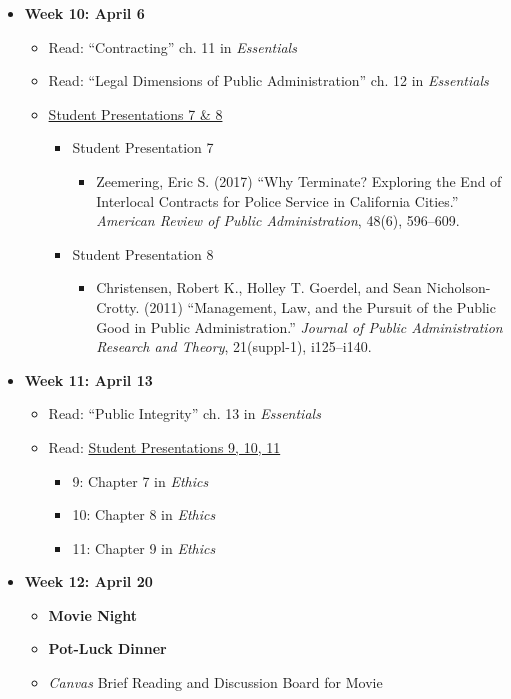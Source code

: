 \documentclass[11pt]{article}
\begin{document}
\begin{itemize}
	\item[] \textbf{Week 10: April 6} 
	\begin{itemize}
		\item Read: ``Contracting'' ch. 11 in \emph{Essentials}
		\item Read: ``Legal Dimensions of Public Administration'' ch. 12 in \emph{Essentials}
		\item \underline{Student Presentations 7 \& 8}
			\begin{itemize}
				\item Student Presentation 7
					\begin{itemize}
						\item Zeemering, Eric S. (2017) ``Why Terminate? Exploring the End of Interlocal Contracts for Police Service in California Cities.'' \emph{American Review of Public Administration}, 48(6), 596--609.
					\end{itemize}
				\item Student Presentation 8
					\begin{itemize}
						\item Christensen, Robert K., Holley T. Goerdel, and Sean Nicholson-Crotty. (2011) ``Management, Law, and the Pursuit of the Public Good in Public Administration.'' \emph{Journal of Public Administration Research and Theory}, 21(suppl-1), i125--i140.
					\end{itemize}
			\end{itemize}
	\end{itemize}
	
	\item[] \textbf{Week 11: April 13}
		\begin{itemize}
			\item Read: ``Public Integrity'' ch. 13 in \emph{Essentials}
			\item Read: \underline{Student Presentations 9, 10, 11}
				\begin{itemize}
					\item 9: Chapter 7 in \emph{Ethics}
					\item 10: Chapter 8 in \emph{Ethics}
					\item 11: Chapter 9 in \emph{Ethics}
					
				\end{itemize}
		\end{itemize}
	
	\item[] \textbf{Week 12: April 20}
	\begin{itemize}
		\item \textbf{Movie Night}
		\item \textbf{Pot-Luck Dinner}
		\item \emph{Canvas} Brief Reading and Discussion Board for Movie
	\end{itemize}


\end{itemize}
\end{document}

